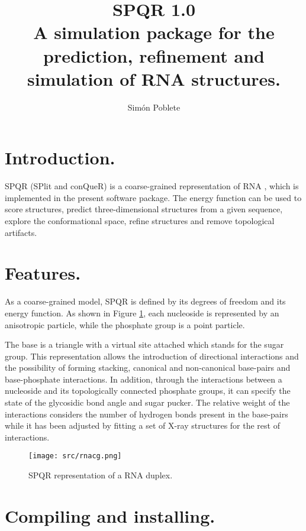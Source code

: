 \documentclass{article}
\title{SPQR 1.0\\A simulation package for the prediction, refinement and simulation of RNA structures.}
\author{Sim\'on Poblete}
\date{}
\begin{document}
\maketitle
\section{Introduction.}

SPQR (SPlit and conQueR) is a coarse-grained representation of RNA \cite{spqr1, spqr2}, which is implemented in the present software package. The energy function can be used to score structures, predict three-dimensional structures from a given sequence, explore the conformational space, refine structures 
and remove topological artifacts.

\section{Features.}

As a coarse-grained model, SPQR is defined by its degrees of freedom and its energy function. As shown in Figure \ref{cg-rep}, each nucleoside is represented by an anisotropic particle, while the phosphate group is a point particle.

The base is a triangle with a virtual site attached which stands for the sugar group.
This representation allows the introduction of directional interactions and the possibility of forming stacking, canonical and non-canonical base-pairs and base-phosphate interactions. In addition, through the interactions between a nucleoside and its topologically connected phosphate groups, it can specify the state of the glycosidic bond angle and sugar pucker. The relative weight of the interactions considers the number of hydrogen bonds present in the base-pairs while it has been adjusted by fitting a set of X-ray structures for the rest of interactions.

\begin{figure}
\begin{center}
  \texttt{[image: src/rnacg.png]}
  \caption{SPQR representation of a RNA duplex.}
\label{cg-rep}
\end{center}
\end{figure}


\section{Compiling and installing.}
\end{document}

